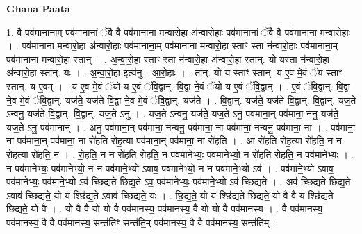 \documentclass[17pt]{extarticle}
\begin{document}
\textbf{Ghana Paata } \newline

1. वै पव॑मानाना॒म् पव॑मानानां॒ ॅवै वै पव॑मानाना मन्वारो॒हा अ॑न्वारो॒हाः पव॑मानानां॒ ॅवै वै पव॑मानाना मन्वारो॒हाः । . पव॑मानाना मन्वारो॒हा अ॑न्वारो॒हाः पव॑मानाना॒म् पव॑मानाना मन्वारो॒हा स्ताꣳ स्ता न॑न्वारो॒हाः पव॑मानाना॒म् पव॑मानाना मन्वारो॒हा स्तान् । . अ॒न्वा॒रो॒हा स्ताꣳ स्ता न॑न्वारो॒हा अ॑न्वारो॒हा स्तान्. यो यस्ता न॑न्वारो॒हा अ॑न्वारो॒हा स्तान्. यः । . अ॒न्वा॒रो॒हा इत्य॑नु - आ॒रो॒हाः । . तान्. यो य स्ताꣳ स्तान्. य ए॒व मे॒वं ॅय स्ताꣳ स्तान्. य ए॒वम् । . य ए॒व मे॒वं ॅयो य ए॒वं ॅवि॒द्वान्. वि॒द्वा ने॒वं ॅयो य ए॒वं ॅवि॒द्वान् । . ए॒वं ॅवि॒द्वान्. वि॒द्वा ने॒व मे॒वं ॅवि॒द्वान्. यज॑ते॒ यज॑ते वि॒द्वा ने॒व मे॒वं ॅवि॒द्वान्. यज॑ते । . वि॒द्वान्. यज॑ते॒ यज॑ते वि॒द्वान्. वि॒द्वान्. यज॒ते ऽन्वनु॒ यज॑ते वि॒द्वान्. वि॒द्वान्. यज॒ते ऽनु॑ । . यज॒ते ऽन्वनु॒ यज॑ते॒ यज॒ते ऽनु॒ पव॑माना॒न् पव॑माना॒ ननु॒ यज॑ते॒ यज॒ते ऽनु॒ पव॑मानान् । . अनु॒ पव॑माना॒न् पव॑माना॒ नन्वनु॒ पव॑माना॒ ना पव॑माना॒ नन्वनु॒ पव॑माना॒ ना । . पव॑माना॒ ना पव॑माना॒न् पव॑माना॒ ना रो॑हति रोह॒त्या पव॑माना॒न् पव॑माना॒ ना रो॑हति । . आ रो॑हति रोह॒त्या रो॑हति॒ न न रो॑ह॒त्या रो॑हति॒ न । . रो॒ह॒ति॒ न न रो॑हति रोहति॒ न पव॑मानेभ्यः॒ पव॑मानेभ्यो॒ न रो॑हति रोहति॒ न पव॑मानेभ्यः । . न पव॑मानेभ्यः॒ पव॑मानेभ्यो॒ न न पव॑माने॒भ्यो ऽवाव॒ पव॑मानेभ्यो॒ न न पव॑माने॒भ्यो ऽव॑ । . पव॑माने॒भ्यो ऽवाव॒ पव॑मानेभ्यः॒ पव॑माने॒भ्यो ऽव॑ च्छिद्यते छिद्य॒ते ऽव॒ पव॑मानेभ्यः॒ पव॑माने॒भ्यो ऽव॑ च्छिद्यते । . अव॑ च्छिद्यते छिद्य॒ते ऽवाव॑ च्छिद्यते॒ यो य श्छि॑द्य॒ते ऽवाव॑ च्छिद्यते॒ यः । . छि॒द्य॒ते॒ यो य श्छि॑द्यते छिद्यते॒ यो वै वै य श्छि॑द्यते छिद्यते॒ यो वै । . यो वै वै यो यो वै पव॑मानस्य॒ पव॑मानस्य॒ वै यो यो वै पव॑मानस्य । . वै पव॑मानस्य॒ पव॑मानस्य॒ वै वै पव॑मानस्य॒ सन्त॑तिꣳ॒॒ सन्त॑ति॒म् पव॑मानस्य॒ वै वै पव॑मानस्य॒ सन्त॑तिम् । \newline
\end{document}
